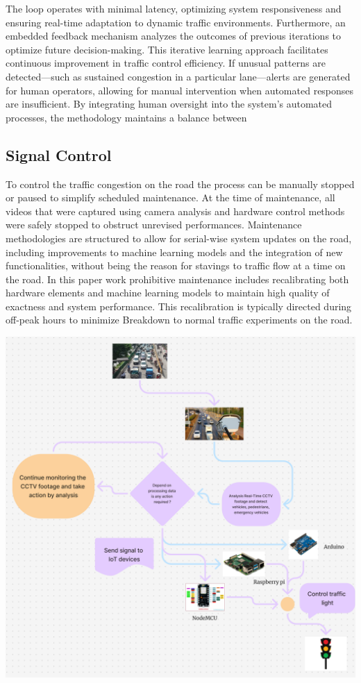 \documentclass[conference]{IEEEtran}
\begin{document}
The loop operates with minimal latency, optimizing system responsiveness and ensuring real-time adaptation to dynamic traffic environments. Furthermore, an embedded feedback mechanism analyzes the outcomes of previous iterations to optimize future decision-making. This iterative learning approach facilitates continuous improvement in traffic control efficiency. If unusual patterns are detected—such as sustained congestion in a particular lane—alerts are generated for human operators, allowing for manual intervention when automated responses are insufficient. By integrating human oversight into the system's automated processes, the methodology maintains a balance between

\subsection{Signal Control}
To control the traffic congestion on the road the process can be manually stopped or paused to simplify scheduled maintenance. At the time of maintenance, all videos that were captured using camera analysis and hardware control methods were safely stopped to obstruct unrevised performances. Maintenance methodologies are structured to allow for serial-wise system updates on the road, including improvements to machine learning models and the integration of new functionalities, without being the reason for stavings to traffic flow at a time on the road. In this paper work prohibitive maintenance includes recalibrating both hardware elements and machine learning models to maintain high quality of exactness and system performance. This recalibration is typically directed during off-peak hours to minimize Breakdown to normal traffic experiments on the road.

\vspace{0.5cm}
\begin{minipage}{0.5\textwidth}
    \centering
    \includegraphics[width=\textwidth]{6_.png}
\end{minipage}%
\end{document}
